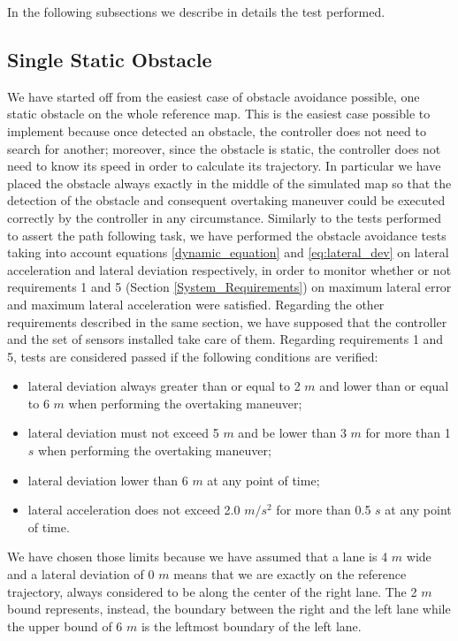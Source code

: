 In the following subsections we describe in details the test performed.

\subsection{Single Static Obstacle}
\label{sub:single_static_obstacle}
We have started off from the easiest case of obstacle avoidance possible, one static obstacle on the whole reference map. This is the easiest case possible to implement because once detected an obstacle, the controller does not need to search for another; moreover, since the obstacle is static, the controller does not need to know its speed in order to calculate its trajectory.
In particular we have placed the obstacle always exactly in the middle of the simulated map so that the detection of the obstacle and consequent overtaking maneuver could be executed correctly by the controller in any circumstance.
Similarly to the tests performed to assert the path following task, we have performed the obstacle avoidance tests taking into account equations \ref{dynamic_equation} and \ref{eq:lateral_dev} on lateral acceleration and lateral deviation respectively, in order to monitor whether or not requirements 1 and 5 (Section \ref{System_Requirements}) on maximum lateral error and maximum lateral acceleration were satisfied.
Regarding the other requirements described in the same section, we have supposed that the controller and the set of sensors installed take care of them.
Regarding requirements 1 and 5, tests are considered passed if the following conditions are verified:
\begin{itemize}
    \item lateral deviation always greater than or equal to 2 $m$ and lower than or equal to 6 $m$ when performing the overtaking maneuver;
    \item  lateral deviation must not exceed 5 $m$ and be lower than 3 $m$ for more than 1 $s$ when performing the overtaking maneuver; 
    \item lateral deviation lower than 6 $m$ at any point of time;
    \item lateral acceleration does not exceed 2.0 $m/s^2$ for more than 0.5 $s$ at any point of time.
\end{itemize}
We have chosen those limits because we have assumed that a lane is 4 $m$ wide and a lateral deviation of 0 $m$ means that we are exactly on the reference trajectory, always considered to be along the center of the right lane. The 2 $m$ bound represents, instead, the boundary between the right and the left lane while the upper bound of 6 $m$ is the leftmost boundary of the left lane.
